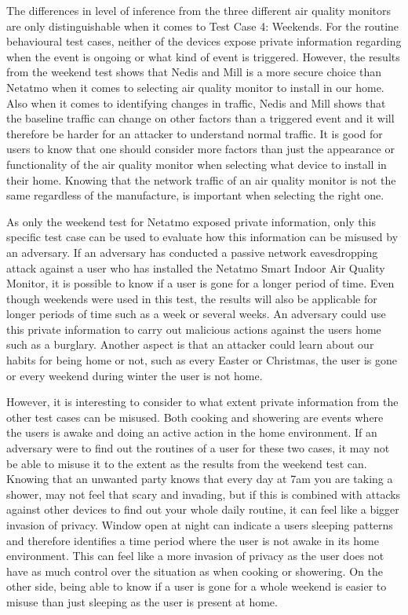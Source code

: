 The differences in level of inference from the three different air quality monitors are only distinguishable when it comes to Test Case 4: Weekends. For the routine behavioural test cases, neither of the devices expose private information regarding when the event is ongoing or what kind of event is triggered. However, the results from the weekend test shows that Nedis and Mill is a more secure choice than Netatmo when it comes to selecting air quality monitor to install in our home. Also when it comes to identifying changes in traffic, Nedis and Mill shows that the baseline traffic can change on other factors than a triggered event and it will therefore be harder for an attacker to understand normal traffic. It is good for users to know that one should consider more factors than just the appearance or functionality of the air quality monitor when selecting what device to install in their home. Knowing that the network traffic of an air quality monitor is not the same regardless of the manufacture, is important when selecting the right one. 

As only the weekend test for Netatmo exposed private information, only this specific test case can be used to evaluate how this information can be misused by an adversary. If an adversary has conducted a passive network eavesdropping attack against a user who has installed the Netatmo Smart Indoor Air Quality Monitor, it is possible to know if a user is gone for a longer period of time. Even though weekends were used in this test, the results will also be applicable for longer periods of time such as a week or several weeks. An adversary could use this private information to carry out malicious actions against the users home such as a burglary. Another aspect is that an attacker could learn about our habits for being home or not, such as every Easter or Christmas, the user is gone or every weekend during winter the user is not home. 

However, it is interesting to consider to what extent private information from the other test cases can be misused. Both cooking and showering are events where the users is awake and doing an active action in the home environment. If an adversary were to find out the routines of a user for these two cases, it may not be able to misuse it to the extent as the results from the weekend test can. Knowing that an unwanted party knows that every day at 7am you are taking a shower, may not feel that scary and invading, but if this is combined with attacks against other devices to find out your whole daily routine, it can feel like a bigger invasion of privacy. Window open at night can indicate a users sleeping patterns and therefore identifies a time period where the user is not awake in its home environment. This can feel like a more invasion of privacy as the user does not have as much control over the situation as when cooking or showering. On the other side, being able to know if a user is gone for a whole weekend is easier to misuse than just sleeping as the user is present at home.   

